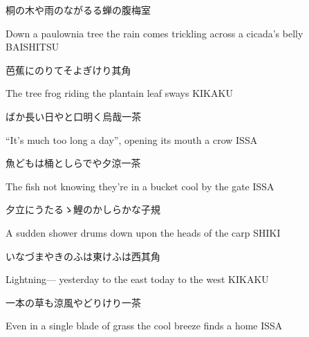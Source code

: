 \begin{haiku}
    {\FH 桐の木や雨のながるる蝉の腹}\hfill{\FH 梅室}

    \vin{} Down a paulownia tree
    \vin{} \vin{} the rain comes trickling
    \vin{} \vin{} \vin{} across a cicada's belly \hspace{\fill} BAISHITSU
\end{haiku}

\begin{haiku}
    {\FH {}芭蕉にのりてそよぎけり}\hfill{\FH 其角}

    \vin{} The tree frog
    \vin{} \vin{} riding the plantain leaf
    \vin{} \vin{} \vin{} sways \hspace{\fill} KIKAKU
\end{haiku}

\begin{haiku}
    {\FH ばか長い日やと口明く烏哉}\hfill{\FH 一茶}

    \vin{} ``It's much too long a day'',
    \vin{} \vin{} opening its mouth
    \vin{} \vin{} \vin{} a crow \hspace{\fill} ISSA
\end{haiku}

\begin{haiku}
    {\FH 魚どもは桶としらでや夕涼}\hfill{\FH 一茶}

    \vin{} The fish
    \vin{} \vin{} not knowing they're in a bucket
    \vin{} \vin{} \vin{} cool by the gate \hspace{\fill} ISSA
\end{haiku}

\begin{haiku}
    {\FH 夕立にうたるゝ鯉のかしらかな}\hfill{\FH 子規}

    \vin{} A sudden shower
    \vin{} \vin{} drums down upon
    \vin{} \vin{} \vin{} the heads of the carp \hspace{\fill} SHIKI
\end{haiku}

\begin{haiku}
    {\FH いなづまやきのふは東けふは西}\hfill{\FH 其角}

    \vin{} Lightning---
    \vin{} \vin{} yesterday to the east
    \vin{} \vin{} \vin{} today to the west \hspace{\fill} KIKAKU
\end{haiku}

\begin{haiku}
    {\FH 一本の草も涼風やどりけり}\hfill{\FH 一茶}

    \vin{} Even in a single blade of grass
    \vin{} \vin{} the cool breeze
    \vin{} \vin{} \vin{} finds a home \hspace{\fill} ISSA
\end{haiku}

